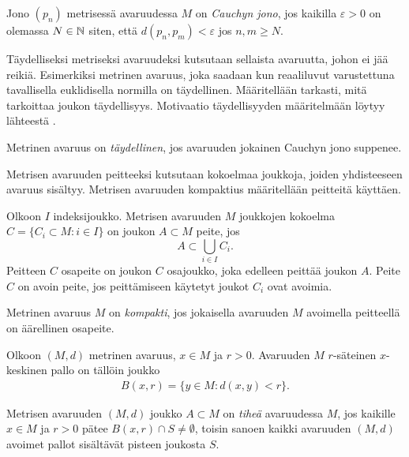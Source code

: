 \documentclass[12pt,oneside,a4paper]{amsbook} %
\begin{document}
\begin{definition}
    Jono $(p_n)$ metrisessä avaruudessa $M$ on \textit{Cauchyn jono}, jos kaikilla $\varepsilon > 0$ on olemassa $N\in \mathbf{\mathbb{N}}$ siten, että $d(p_n, p_m) < \varepsilon$ jos $n, m\ge N$.
\end{definition}

Täydelliseksi metriseksi avaruudeksi kutsutaan sellaista avaruutta, johon ei jää reikiä. Esimerkiksi metrinen avaruus, joka saadaan kun reaaliluvut varustettuna tavallisella euklidisella normilla on täydellinen. Määritellään tarkasti, mitä tarkoittaa joukon täydellisyys. Motivaatio täydellisyyden määritelmään löytyy lähteestä \cite[s. 54]{rudin}.

\begin{definition}
    Metrinen avaruus on \textit{täydellinen}, jos avaruuden jokainen Cauchyn jono suppenee. 
\end{definition} 

Metrisen avaruuden peitteeksi kutsutaan kokoelmaa joukkoja, joiden yhdisteeseen avaruus sisältyy. Metrisen avaruuden kompaktius määritellään peitteitä käyttäen.

\begin{definition}
    Olkoon $I$ indeksijoukko. Metrisen avaruuden $M$ joukkojen kokoelma $C = \{C_i \subset M \colon i \in I\}$ on joukon $A \subset M$ peite, jos 
    \begin{equation*}
        A \subset \bigcup_{i\in I}C_i.
    \end{equation*}
    Peitteen $C$ osapeite on joukon $C$ osajoukko, joka edelleen peittää joukon $A$. Peite $C$ on avoin peite, jos peittämiseen käytetyt joukot $C_i$ ovat avoimia. 
\end{definition}

\begin{definition}
    Metrinen avaruus $M$ on \textit{kompakti}, jos jokaisella avaruuden $M$ avoimella peitteellä on äärellinen osapeite. 
\end{definition}

\begin{definition}
    Olkoon $(M, d)$ metrinen avaruus, $x \in M$ ja $r > 0$. Avaruuden $M$ $r$-säteinen $x$-keskinen pallo on tällöin joukko
    \begin{align*}
        B(x, r) = \{y \in M : d(x, y) < r\}.
    \end{align*}
\end{definition}

\begin{definition}
    Metrisen avaruuden $(M, d)$ joukko $A \subset M$ on \textit{tiheä} avaruudessa $M$, jos kaikille $x \in M$ ja $r > 0$ pätee $B(x, r) \cap S \ne \emptyset$, toisin sanoen kaikki avaruuden $(M, d)$ avoimet pallot sisältävät pisteen joukosta $S$.
\end{definition}
\end{document}
